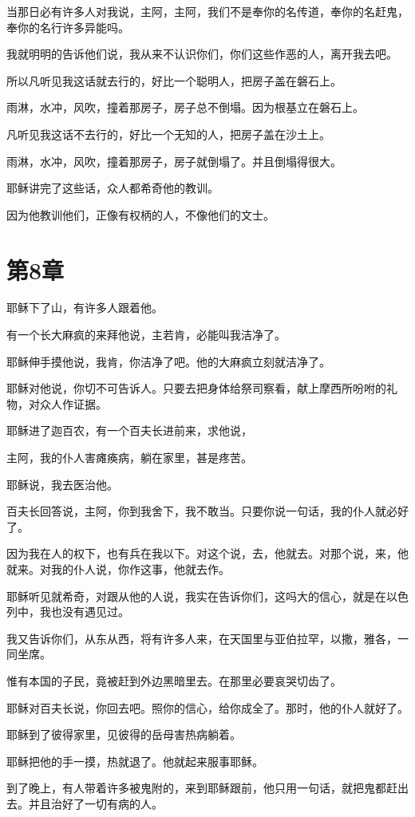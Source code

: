 \documentclass[12pt,oneside]{book}
\begin{document}
当那日必有许多人对我说，主阿，主阿，我们不是奉你的名传道，奉你的名赶鬼，奉你的名行许多异能吗。

我就明明的告诉他们说，我从来不认识你们，你们这些作恶的人，离开我去吧。

所以凡听见我这话就去行的，好比一个聪明人，把房子盖在磐石上。

雨淋，水冲，风吹，撞着那房子，房子总不倒塌。因为根基立在磐石上。

凡听见我这话不去行的，好比一个无知的人，把房子盖在沙土上。

雨淋，水冲，风吹，撞着那房子，房子就倒塌了。并且倒塌得很大。

耶稣讲完了这些话，众人都希奇他的教训。

因为他教训他们，正像有权柄的人，不像他们的文士。

\chapter{第8章}
耶稣下了山，有许多人跟着他。

有一个长大麻疯的来拜他说，主若肯，必能叫我洁净了。

耶稣伸手摸他说，我肯，你洁净了吧。他的大麻疯立刻就洁净了。

耶稣对他说，你切不可告诉人。只要去把身体给祭司察看，献上摩西所吩咐的礼物，对众人作证据。

耶稣进了迦百农，有一个百夫长进前来，求他说，

主阿，我的仆人害瘫痪病，躺在家里，甚是疼苦。

耶稣说，我去医治他。

百夫长回答说，主阿，你到我舍下，我不敢当。只要你说一句话，我的仆人就必好了。

因为我在人的权下，也有兵在我以下。对这个说，去，他就去。对那个说，来，他就来。对我的仆人说，你作这事，他就去作。

耶稣听见就希奇，对跟从他的人说，我实在告诉你们，这吗大的信心，就是在以色列中，我也没有遇见过。

我又告诉你们，从东从西，将有许多人来，在天国里与亚伯拉罕，以撒，雅各，一同坐席。

惟有本国的子民，竟被赶到外边黑暗里去。在那里必要哀哭切齿了。

耶稣对百夫长说，你回去吧。照你的信心，给你成全了。那时，他的仆人就好了。

耶稣到了彼得家里，见彼得的岳母害热病躺着。

耶稣把他的手一摸，热就退了。他就起来服事耶稣。

到了晚上，有人带着许多被鬼附的，来到耶稣跟前，他只用一句话，就把鬼都赶出去。并且治好了一切有病的人。
\end{document}
